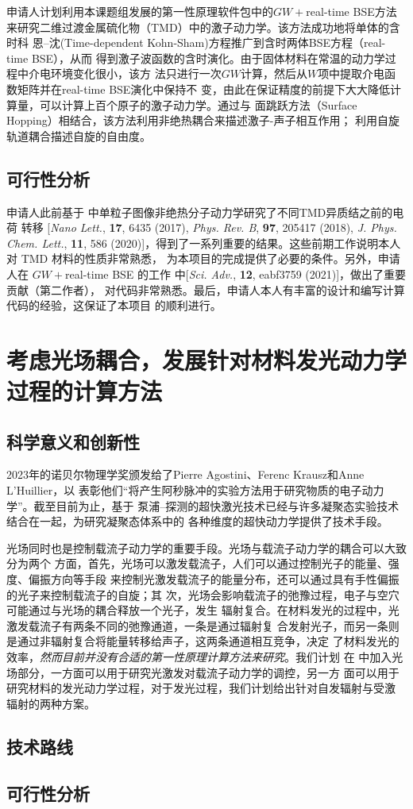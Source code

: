 申请人计划利用本课题组发展的第一性原理软件包\hnamd{}中的$GW+{}$real-time BSE方法
来研究二维过渡金属硫化物（TMD）中的激子动力学。该方法成功地将单体的含时科
恩--沈(Time-dependent Kohn-Sham)方程推广到含时两体BSE方程（real-time BSE），从而
得到激子波函数的含时演化。由于固体材料在常温的动力学过程中介电环境变化很小，该方
法只进行一次$GW$计算，然后从$W$项中提取介电函数矩阵并在real-time BSE演化中保持不
变，由此在保证精度的前提下大大降低计算量，可以计算上百个原子的激子动力学。通过与
面跳跃方法（Surface Hopping）相结合，该方法利用非绝热耦合来描述激子-声子相互作用；
利用自旋轨道耦合描述自旋的自由度。


\subsection{可行性分析}

申请人此前基于 \hnamd{} 中单粒子图像非绝热分子动力学研究了不同TMD异质结之前的电荷
转移 [\textit{Nano Lett.}, \textbf{17}, 6435 (2017), \textit{Phys. Rev. B},
\textbf{97}, 205417 (2018), \textit{J. Phys. Chem. Lett.}, \textbf{11}, 586
(2020)]，得到了一系列重要的结果。这些前期工作说明本人对 TMD 材料的性质非常熟悉，
为本项目的完成提供了必要的条件。另外，申请人在 $GW+{}$real-time BSE 的工作
中[\textit{Sci. Adv.}, \textbf{12}, eabf3759 (2021)]，做出了重要贡献（第二作者），
对代码非常熟悉。最后，申请人本人有丰富的设计和编写计算代码的经验，这保证了本项目
的顺利进行。

\section{考虑光场耦合，发展针对材料发光动力学过程的计算方法}

\subsection{科学意义和创新性}

2023年的诺贝尔物理学奖颁发给了Pierre Agostini、Ferenc Krausz和Anne L'Huillier，以
表彰他们``将产生阿秒脉冲的实验方法用于研究物质的电子动力学''。截至目前为止，基于
泵浦--探测的超快激光技术已经与许多凝聚态实验技术结合在一起，为研究凝聚态体系中的
各种维度的超快动力学提供了技术手段。

光场同时也是控制载流子动力学的重要手段。光场与载流子动力学的耦合可以大致分为两个
方面，首先，光场可以激发载流子，人们可以通过控制光子的能量、强度、偏振方向等手段
来控制光激发载流子的能量分布，还可以通过具有手性偏振的光子来控制载流子的自旋；其
次，光场会影响载流子的弛豫过程，电子与空穴可能通过与光场的耦合释放一个光子，发生
辐射复合。在材料发光的过程中，光激发载流子有两条不同的弛豫通道，一条是通过辐射复
合发射光子，而另一条则是通过非辐射复合将能量转移给声子，这两条通道相互竞争，决定
了材料发光的效率，\emph{然而目前并没有合适的第一性原理计算方法来研究}。我们计划
在 \hnamd{} 中加入光场部分，一方面可以用于研究光激发对载流子动力学的调控，另一方
面可以用于研究材料的发光动力学过程，对于发光过程，我们计划给出针对自发辐射与受激
辐射的两种方案。

\subsection{技术路线}

\subsection{可行性分析}
